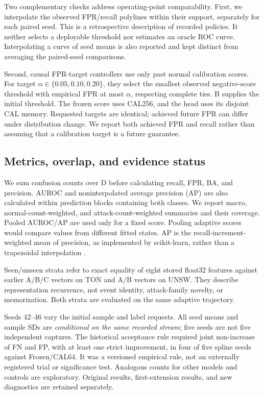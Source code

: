 Two complementary checks address operating-point comparability. First, we interpolate the observed FPR/recall polylines within their support, separately for each paired seed. This is a retrospective description of recorded policies. It neither selects a deployable threshold nor estimates an oracle ROC curve. Interpolating a curve of seed means is also reported and kept distinct from averaging the paired-seed comparisons.

Second, causal FPR-target controllers use only past normal calibration scores. For target $\alpha\in\{0.05,0.10,0.20\}$, they select the smallest observed negative-score threshold with empirical FPR at most $\alpha$, respecting complete ties. B supplies the initial threshold. The frozen score uses CAL256, and the head uses its disjoint CAL memory. Requested targets are identical; achieved future FPR can differ under distribution change. We report both achieved FPR and recall rather than assuming that a calibration target is a future guarantee.

\subsection{Metrics, overlap, and evidence status}
We sum confusion counts over D before calculating recall, FPR, BA, and precision. AUROC and noninterpolated average precision (AP) are also calculated within prediction blocks containing both classes. We report macro, normal-count-weighted, and attack-count-weighted summaries and their coverage. Pooled AUROC/AP are used only for a fixed score. Pooling adaptive scores would compare values from different fitted states. AP is the recall-increment-weighted mean of precision, as implemented by scikit-learn, rather than a trapezoidal interpolation \citep{pedregosa2011,sklearnap}.

Seen/unseen strata refer to exact equality of eight stored float32 features against earlier A/B/C vectors on TON and A/B vectors on UNSW. They describe representation recurrence, not event identity, attack-family novelty, or memorization. Both strata are evaluated on the same adaptive trajectory.

Seeds 42--46 vary the initial sample and label requests. All seed means and sample SDs are \emph{conditional on the same recorded stream}; five seeds are not five independent captures. The historical acceptance rule required joint non-increase of FN and FP, with at least one strict improvement, in four of five spline seeds against Frozen/CAL64. It was a versioned empirical rule, not an externally registered trial or significance test. Analogous counts for other models and controls are exploratory. Original results, first-extension results, and new diagnostics are retained separately.


